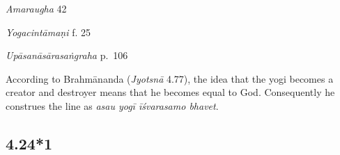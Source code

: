 \begin{ekdosis}
\begin{sources}[hp04_024]
\emph{Amaraugha} 42
\begin{versinnote}
\tl{\var{rājayogābhidhānakam ] rājayogo 'bhidhīyate Ae}\\!}
\end{versinnote}
\end{sources}

\begin{testimonia}[hp04_024]
\emph{Yogacintāmaṇi} f. 25
\begin{versinnote}
\end{versinnote}

\emph{Upāsanāsārasaṅgraha} p.~106
\begin{versinnote}
\end{versinnote}

\end{testimonia}

\begin{philcomm}[hp04_024]

According to Brahmānanda (\emph{Jyotsnā} 4.77), the idea that the yogi becomes a creator and destroyer means that he becomes equal to God. Consequently he construes the line as \emph{asau yogī īśvarasamo bhavet}.
\end{philcomm}

\subsection*{4.24*1}




\end{ekdosis}
